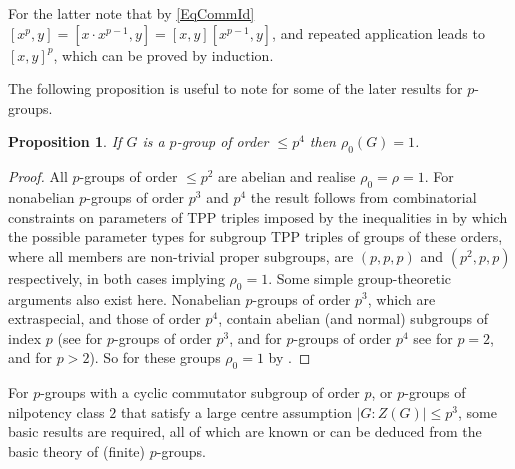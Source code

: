 \documentclass{amsart}
\theoremstyle{observation}
\newtheorem{proposition}[theorem]{Proposition}
\theoremstyle{definition}
\theoremstyle{remark}
\numberwithin{equation}{section}
\begin{document}
For the latter note that by \ref{EqCommId} $[x^p, y] = [x\cdot x^{p - 1}, y] = [x, y][x^{p - 1}, y]$, and repeated application leads to $[x, y]^p$, which can be proved by induction.

\vspace{1mm}

The following proposition is useful to note for some of the later results for $p$-groups.

\begin{proposition}\label{PropRho0p4} If $G$ is a $p$-group of order $\leq p^4$ then $\rho_0(G) = 1$.
\end{proposition}
\begin{proof} All $p$-groups of order $\leq p^2$ are abelian and realise $\rho_0 = \rho = 1$. For nonabelian $p$-groups of order $p^3$ and $p^4$ the result follows from combinatorial constraints on parameters of TPP triples imposed by the inequalities in \citep[Observation 3.1]{Neu2011} by which the possible parameter types for subgroup TPP triples of groups of these orders, where all members are non-trivial proper subgroups, are $(p, p, p)$ and $(p^2, p, p)$ respectively, in both cases implying $\rho_0 = 1$. Some simple group-theoretic arguments also exist here. Nonabelian $p$-groups of order $p^3$, which are extraspecial, and those of order $p^4$, contain abelian (and normal) subgroups of index $p$ (see \citep[Lemma 3.4]{Cra} for $p$-groups of order $p^3$, and for $p$-groups of order $p^4$ see \citep[Lemma 2]{Wil} for $p = 2$, and \citep[Proposition 12]{AGW} for $p > 2$). So for these groups $\rho_0 = 1$ by \citep[Corollary 4.3]{Mur}.
\end{proof}

For $p$-groups with a cyclic commutator subgroup of order $p$, or $p$-groups of nilpotency class $2$ that satisfy a large centre assumption $|G:Z(G)| \leq p^3$, some basic results are required, all of which are known or can be deduced from the basic theory of (finite) $p$-groups.
\end{document}
